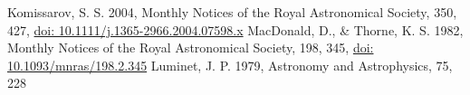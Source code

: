 \documentclass[../main.tex]{subfiles}
\begin{document}
\begin{thebibliography}{9} %
 Komissarov, S. S. 2004, Monthly Notices of the Royal Astronomical Society,
350, 427, \href{http://doi.org/10.1111/j.1365-2966.2004.07598.x}{doi: 10.1111/j.1365-2966.2004.07598.x}
 MacDonald, D., \& Thorne, K. S. 1982, Monthly Notices of the Royal Astronomical Society, 198, 345,
\href{http://doi.org/10.1093/mnras/198.2.345}{doi: 10.1093/mnras/198.2.345}
 Luminet, J. P. 1979, Astronomy and Astrophysics, 75, 228
\end{thebibliography}
\end{document}
